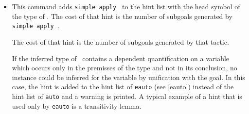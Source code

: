 \begin{itemize}
\item {}

  This command adds {\tt simple apply {\term}} to the hint list
  with the head symbol of the type of \term. The cost of that hint is
  the number of subgoals generated by {\tt simple apply {\term}}.

  The cost of that hint is the number of subgoals generated by that
  tactic.


  If the inferred type of \term\ contains a dependent quantification
  on a variable which occurs only in the premisses of the type and not
  in its conclusion, no instance could be inferred for the variable by
  unification with the goal. In this case, the hint is added to the
  hint list of {\tt eauto} (see \ref{eauto}) instead of the hint list
  of {\tt auto} and a warning is printed. A typical example of a hint
  that is used only by \texttt{eauto} is a transitivity lemma.


\end{itemize}
